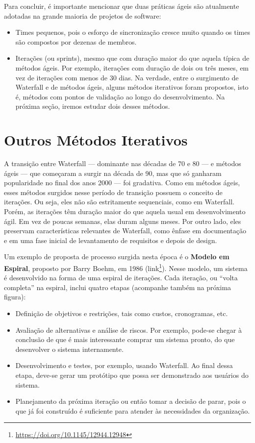 \documentclass[
  11pt,
  twoside]{book}
\DeclareRobustCommand{\href}[2]{#2\footnote{\url{#1}}}
\begin{document}
Para concluir, é importante mencionar que duas práticas ágeis são
atualmente adotadas na grande maioria de projetos de software:

\begin{itemize}
\item
  Times pequenos, pois o esforço de sincronização cresce muito quando os
  times são compostos por dezenas de membros.
\item
  Iterações (ou sprints), mesmo que com duração maior do que aquela
  típica de métodos ágeis. Por exemplo, iterações com duração de dois ou
  três meses, em vez de iterações com menos de 30 dias. Na verdade,
  entre o surgimento de Waterfall e de métodos ágeis, alguns métodos
  iterativos foram propostos, isto é, métodos com pontos de validação ao
  longo do desenvolvimento. Na próxima seção, iremos estudar dois desses
  métodos.
\end{itemize}

\hypertarget{outros-muxe9todos-iterativos}{%
\section{Outros Métodos Iterativos}\label{outros-muxe9todos-iterativos}}

A transição entre Waterfall --- dominante nas décadas de 70 e 80 --- e
métodos ágeis --- que começaram a surgir na década de 90, mas que só
ganharam popularidade no final dos anos 2000 --- foi gradativa. Como em
métodos ágeis, esses métodos surgidos nesse período de transição possuem
o conceito de iterações. Ou seja, eles não são estritamente sequenciais,
como em Waterfall. Porém, as iterações têm duração maior do que aquela
usual em desenvolvimento ágil. Em vez de poucas semanas, elas duram
alguns meses. Por outro lado, eles preservam características relevantes
de Waterfall, como ênfase em documentação e em uma fase inicial de
levantamento de requisitos e depois de design.

  Um exemplo de proposta de
processo surgida nesta época é o \textbf{Modelo em Espiral}, proposto
por Barry Boehm, em 1986
(\href{https://doi.org/10.1145/12944.12948}{link}). Nesse modelo, um
sistema é desenvolvido na forma de uma espiral de iterações. Cada
iteração, ou ``volta completa'' na espiral, inclui quatro etapas
(acompanhe também na próxima figura):

\begin{itemize}
\item
  Definição de objetivos e restrições, tais como custos, cronogramas,
  etc.
\item
  Avaliação de alternativas e análise de riscos. Por exemplo, pode-se
  chegar à conclusão de que é mais interessante comprar um sistema
  pronto, do que desenvolver o sistema internamente.
\item
  Desenvolvimento e testes, por exemplo, usando Waterfall. Ao final
  dessa etapa, deve-se gerar um protótipo que possa ser demonstrado aos
  usuários do sistema.
\item
  Planejamento da próxima iteração ou então tomar a decisão de parar,
  pois o que já foi construído é suficiente para atender às necessidades
  da organização.
\end{itemize}
\end{document}

